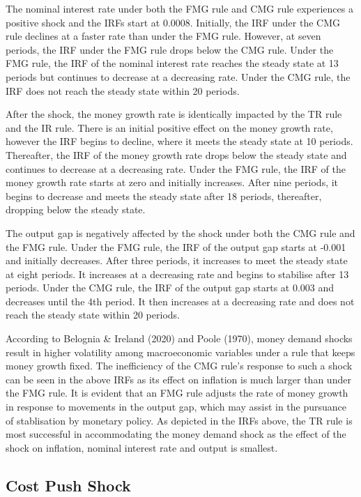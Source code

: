 \documentclass[11pt,preprint, authoryear]{elsarticle}
\numberwithin{equation}{section}
\numberwithin{figure}{section}
\numberwithin{table}{section}
\begin{document}
The nominal interest rate under both the FMG rule and CMG rule
experiences a positive shock and the IRFs start at 0.0008. Initially,
the IRF under the CMG rule declines at a faster rate than under the FMG
rule. However, at seven periods, the IRF under the FMG rule drops below
the CMG rule. Under the FMG rule, the IRF of the nominal interest rate
reaches the steady state at 13 periods but continues to decrease at a
decreasing rate. Under the CMG rule, the IRF does not reach the steady
state within 20 periods.

After the shock, the money growth rate is identically impacted by the TR
rule and the IR rule. There is an initial positive effect on the money
growth rate, however the IRF begins to decline, where it meets the
steady state at 10 periods. Thereafter, the IRF of the money growth rate
drops below the steady state and continues to decrease at a decreasing
rate. Under the FMG rule, the IRF of the money growth rate starts at
zero and initially increases. After nine periods, it begins to decrease
and meets the steady state after 18 periods, thereafter, dropping below
the steady state.

The output gap is negatively affected by the shock under both the CMG
rule and the FMG rule. Under the FMG rule, the IRF of the output gap
starts at -0.001 and initially decreases. After three periods, it
increases to meet the steady state at eight periods. It increases at a
decreasing rate and begins to stabilise after 13 periods. Under the CMG
rule, the IRF of the output gap starts at 0.003 and decreases until the
4th period. It then increases at a decreasing rate and does not reach
the steady state within 20 periods.

According to Belognia \& Ireland (2020) and Poole (1970), money demand
shocks result in higher volatility among macroeconomic variables under a
rule that keeps money growth fixed. The inefficiency of the CMG rule's
response to such a shock can be seen in the above IRFs as its effect on
inflation is much larger than under the FMG rule. It is evident that an
FMG rule adjusts the rate of money growth in response to movements in
the output gap, which may assist in the pursuance of stablisation by
monetary policy. As depicted in the IRFs above, the TR rule is most
successful in accommodating the money demand shock as the effect of the
shock on inflation, nominal interest rate and output is smallest.

\hypertarget{cost-push-shock}{%
\subsection{Cost Push Shock}\label{cost-push-shock}}
\end{document}
